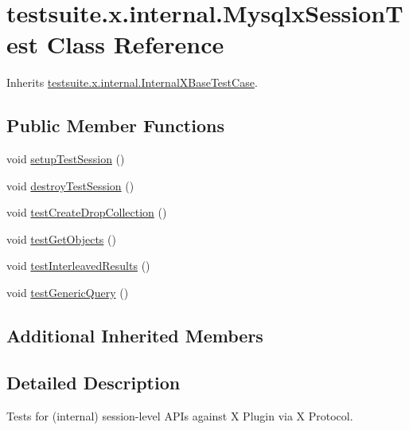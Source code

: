 \hypertarget{classtestsuite_1_1x_1_1internal_1_1_mysqlx_session_test}{}\section{testsuite.\+x.\+internal.\+Mysqlx\+Session\+Test Class Reference}
\label{classtestsuite_1_1x_1_1internal_1_1_mysqlx_session_test}


Inherits \mbox{\hyperlink{classtestsuite_1_1x_1_1internal_1_1_internal_x_base_test_case}{testsuite.\+x.\+internal.\+Internal\+X\+Base\+Test\+Case}}.

\subsection*{Public Member Functions}
\begin{DoxyCompactItemize}
\item 
void \mbox{\hyperlink{classtestsuite_1_1x_1_1internal_1_1_mysqlx_session_test_ae6b3b8eb8585b32120f3ae453cbbca59}{setup\+Test\+Session}} ()
\item 
void \mbox{\hyperlink{classtestsuite_1_1x_1_1internal_1_1_mysqlx_session_test_a6fbf2b0b0b4206849d2871414fbd136d}{destroy\+Test\+Session}} ()
\item 
void \mbox{\hyperlink{classtestsuite_1_1x_1_1internal_1_1_mysqlx_session_test_a445003cabcccd35700a43be68d69c185}{test\+Create\+Drop\+Collection}} ()
\item 
void \mbox{\hyperlink{classtestsuite_1_1x_1_1internal_1_1_mysqlx_session_test_ab16c60a2c7a6c7353e27ffdb0e5217a0}{test\+Get\+Objects}} ()
\item 
void \mbox{\hyperlink{classtestsuite_1_1x_1_1internal_1_1_mysqlx_session_test_a95056ffc22da5604859be3d0c9bd16fb}{test\+Interleaved\+Results}} ()
\item 
void \mbox{\hyperlink{classtestsuite_1_1x_1_1internal_1_1_mysqlx_session_test_af28cb4654c36218a22a00f110749c6ed}{test\+Generic\+Query}} ()
\end{DoxyCompactItemize}
\subsection*{Additional Inherited Members}


\subsection{Detailed Description}
Tests for (internal) session-\/level A\+P\+Is against X Plugin via X Protocol. 

